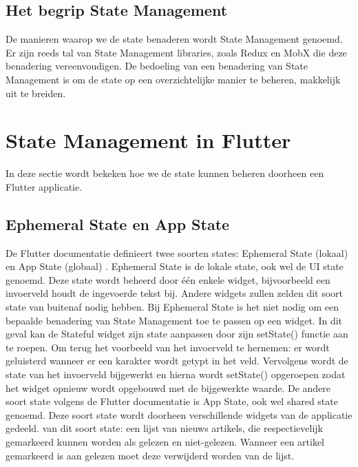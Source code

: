 \subsection{Het begrip State Management}
De manieren waarop we de state benaderen wordt State Management genoemd. Er zijn reeds tal van State Management libraries, zoals Redux en MobX die deze benadering vereenvoudigen. De bedoeling van een benadering van State Management is om de state op een overzichtelijke manier te beheren, makkelijk uit te breiden.

\section{State Management in Flutter}
In deze sectie wordt bekeken hoe we de state kunnen beheren doorheen een Flutter applicatie.

\subsection{Ephemeral State en App State}
De Flutter documentatie definieert twee soorten states: Ephemeral State (lokaal) en App State (globaal) \autocite{Developers2019}.
Ephemeral State is de lokale state, ook wel de UI state genoemd. Deze state wordt beheerd door één enkele widget, bijvoorbeeld een invoerveld houdt de ingevoerde tekst bij. Andere widgets zullen zelden dit soort state van buitenaf nodig hebben. Bij Ephemeral State is het niet nodig om een bepaalde benadering van State Management toe te passen op een widget. In dit geval kan de Stateful widget zijn state aanpassen door zijn setState() functie aan te roepen.
Om terug het voorbeeld van het invoerveld te hernemen: er wordt geluisterd wanneer er een karakter wordt getypt in het veld. Vervolgens wordt de state van het invoerveld bijgewerkt en hierna wordt setState() opgeroepen zodat het widget opnieuw wordt opgebouwd met de bijgewerkte waarde.
\newline
De andere soort state volgens de Flutter documentatie \autocite{Developers2019} is App State, ook wel shared state genoemd. Deze soort state wordt doorheen verschillende widgets van de applicatie gedeeld.
 van dit soort state: een lijst van nieuws artikels, die respectievelijk gemarkeerd kunnen worden als gelezen en niet-gelezen. Wanneer een artikel gemarkeerd is aan gelezen moet deze verwijderd worden van de lijst. 
\newline

